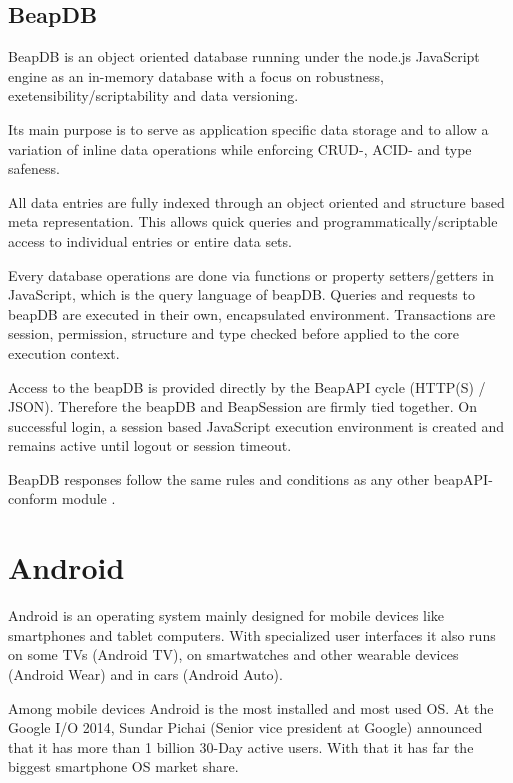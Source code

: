 \documentclass[12pt,a4paper,oneside]{report}
\newcommand{\beapDB}{beapDB}
\begin{document}
\subsection{BeapDB}
BeapDB is an object oriented database running under the node.js JavaScript engine as an in-memory database with a focus on robustness, exetensibility/scriptability and data versioning.
	
Its main purpose is to serve as application specific data storage and to allow a variation of	inline data operations while enforcing CRUD-, ACID- and type safeness.

All data entries are fully indexed through an object oriented and structure based meta representation. This allows quick queries and programmatically/scriptable access to individual entries or entire data sets.
	
Every database operations are done via functions or property setters/getters in JavaScript, which is the query language of \beapDB{}. Queries and requests to \beapDB{} are executed in their own, encapsulated environment. Transactions are session, permission, structure and type checked before applied to the core execution context.
	
Access to the \beapDB{} is provided directly by the BeapAPI cycle (HTTP(S) / JSON). Therefore the \beapDB{} and BeapSession are firmly tied together. On successful login, a session based JavaScript execution environment is created and remains active until logout or session timeout.

BeapDB responses follow the same rules and conditions as any other beapAPI-conform module \citep{siggiInterview}.

\section{Android}
Android is an operating system mainly designed for mobile devices like smartphones and tablet computers. With specialized user interfaces it also runs on some TVs (Android TV), on smartwatches and other wearable devices (Android Wear) and in cars (Android Auto).

Among mobile devices Android is the most installed and most used OS. At the Google I/O 2014, Sundar Pichai (Senior vice president at Google) announced that it has more than 1 billion 30-Day active users. With that it has far the biggest smartphone OS market share. \\
\end{document}
